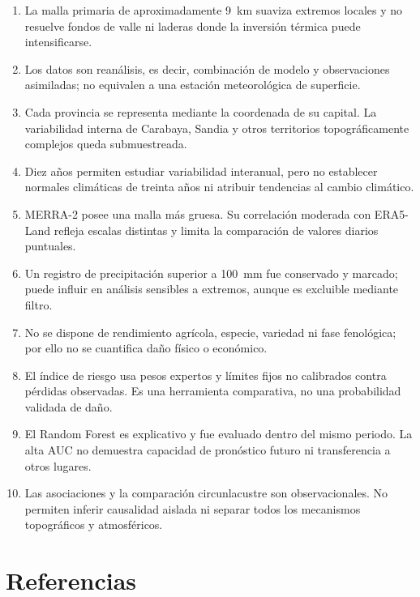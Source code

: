 \documentclass[11pt,a4paper]{article}
\begin{document}
\begin{enumerate}
  \item La malla primaria de aproximadamente 9~km suaviza extremos locales y no resuelve
        fondos de valle ni laderas donde la inversión térmica puede intensificarse.
  \item Los datos son reanálisis, es decir, combinación de modelo y observaciones
        asimiladas; no equivalen a una estación meteorológica de superficie.
  \item Cada provincia se representa mediante la coordenada de su capital. La variabilidad
        interna de Carabaya, Sandia y otros territorios topográficamente complejos queda
        submuestreada.
  \item Diez años permiten estudiar variabilidad interanual, pero no establecer normales
        climáticas de treinta años ni atribuir tendencias al cambio climático.
  \item MERRA-2 posee una malla más gruesa. Su correlación moderada con ERA5-Land refleja
        escalas distintas y limita la comparación de valores diarios puntuales.
  \item Un registro de precipitación superior a 100~mm fue conservado y marcado; puede
        influir en análisis sensibles a extremos, aunque es excluible mediante filtro.
  \item No se dispone de rendimiento agrícola, especie, variedad ni fase fenológica; por
        ello no se cuantifica daño físico o económico.
  \item El índice de riesgo usa pesos expertos y límites fijos no calibrados contra pérdidas
        observadas. Es una herramienta comparativa, no una probabilidad validada de daño.
  \item El Random Forest es explicativo y fue evaluado dentro del mismo periodo. La alta
        AUC no demuestra capacidad de pronóstico futuro ni transferencia a otros lugares.
  \item Las asociaciones y la comparación circunlacustre son observacionales. No permiten
        inferir causalidad aislada ni separar todos los mecanismos topográficos y atmosféricos.
\end{enumerate}

\section{Referencias}
\end{document}
